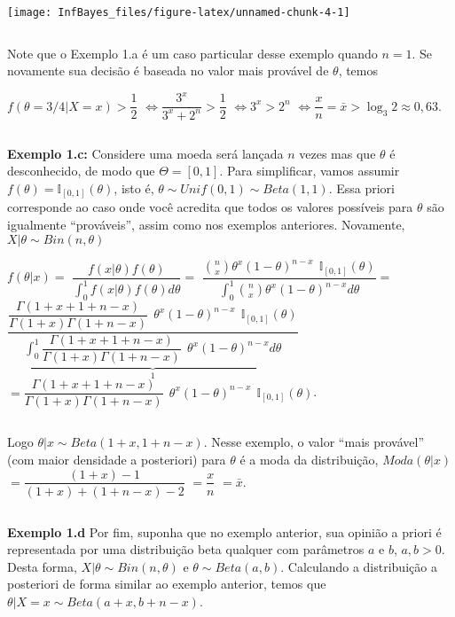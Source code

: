 \documentclass[
]{book}
\begin{document}
\begin{center}\texttt{[image: InfBayes\_files/figure-latex/unnamed-chunk-4-1]} \end{center}

\(~\)

Note que o Exemplo 1.a é um caso particular desse exemplo quando \(n=1\). Se novamente sua decisão é baseada no valor mais provável de \(\theta\), temos

\(f(\theta=3/4|X=x) > \dfrac{1}{2}\) \(\Longleftrightarrow \dfrac{3^x}{3^x + 2^n} > \dfrac{1}{2}\) \(\Longleftrightarrow {3^x} > {2^n}\) \(\Longleftrightarrow \dfrac{x}{n} = \bar{x} > \log_3{2}\approx 0,63\).

\(~\)

\textbf{Exemplo 1.c:} Considere uma moeda será lançada \(n\) vezes mas que \(\theta\) é desconhecido, de modo que \(\Theta = [0,1]\). Para simplificar, vamos assumir \(f(\theta)=\mathbb{I}_{[0,1]}(\theta)\), isto é, \(\theta \sim Unif(0,1)\sim Beta(1,1)\). Essa priori corresponde ao caso onde você acredita que todos os valores possíveis para \(\theta\) são igualmente ``prováveis'', assim como nos exemplos anteriores. Novamente, \(X|\theta \sim Bin(n,\theta)\)

\(f(\theta|x)=\) \(\dfrac{f(x|\theta)f(\theta)}{\int_0^1 f(x|\theta)f(\theta)d\theta}=\) \(\dfrac{\binom{n}{x}\theta^x(1-\theta)^{n-x} ~~\mathbb{I}_{[0,1]}(\theta)}{\int_0^1\binom{n}{x}\theta^x(1-\theta)^{n-x}d\theta}=\) \(\dfrac{\dfrac{\Gamma(1+x+1+n-x)}{\Gamma(1+x)\Gamma(1+n-x)}~~\theta^x(1-\theta)^{n-x}~~\mathbb{I}_{[0,1]}(\theta)}{\underbrace{\displaystyle \int_0^1\dfrac{\Gamma(1+x+1+n-x)}{\Gamma(1+x)\Gamma(1+n-x)}~~\theta^x(1-\theta)^{n-x}d\theta}_{1}}\) \(=\dfrac{\Gamma(1+x+1+n-x)}{\Gamma(1+x)\Gamma(1+n-x)}~~\theta^x(1-\theta)^{n-x}~~\mathbb{I}_{[0,1]}(\theta)\).

\(~\)

Logo \(\theta|x \sim Beta(1+x,1+n-x)\). Nesse exemplo, o valor ``mais provável'' (com maior densidade a posteriori) para \(\theta\) é a moda da distribuição, \(Moda(\theta|x)\) \(= \dfrac{(1+x)-1}{(1+x)+(1+n-x)-2}\) \(= \dfrac{x}{n}\) \(=\bar{x}\).

\(~\)

\textbf{Exemplo 1.d} Por fim, suponha que no exemplo anterior, sua opinião a priori é representada por uma distribuição beta qualquer com parâmetros \(a\) e \(b\), \(a,b > 0\). Desta forma, \(X|\theta \sim Bin(n,\theta)\) e \(\theta\sim Beta(a,b)\). Calculando a distribuição a posteriori de forma similar ao exemplo anterior, temos que \(\theta|X=x \sim Beta(a+x,b+n-x)\).
\end{document}
